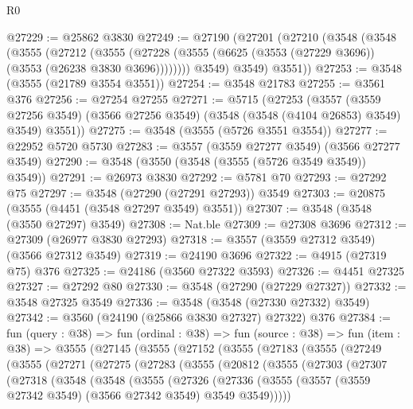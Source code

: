 \begin{lexlean}{R0}
\begin{coremodule}
@27229 := @25862 @3830
@27249 := @27190
    (@27201
      (@27210
        (@3548
          (@3548
            (@3555
              (@27212
                (@3555
                  (@27228 (@3555 (@6625 (@3553 (@27229 @3696)) (@3553 (@26238 @3830 @3696))))))))
            @3549)
          @3549)
        @3551))
@27253 := @3548 (@3555 (@21789 @3554 @3551))
@27254 := @3548 @21783
@27255 := @3561 @376
@27256 := @27254 @27255
@27271 := @5715
    (@27253
      (@3557
        (@3559 @27256 @3549)
        (@3566 @27256 @3549)
        (@3548 (@3548 (@4104 @26853) @3549) @3549)
        @3551))
@27275 := @3548 (@3555 (@5726 @3551 @3554))
@27277 := @22952 @5720 @5730
@27283 := @3557 (@3559 @27277 @3549) (@3566 @27277 @3549)
@27290 := @3548 (@3550 (@3548 (@3555 (@5726 @3549 @3549)) @3549))
@27291 := @26973 @3830
@27292 := @5781 @70
@27293 := @27292 @75
@27297 := @3548 (@27290 (@27291 @27293)) @3549
@27303 := @20875 (@3555 (@4451 (@3548 @27297 @3549) @3551))
@27307 := @3548 (@3548 (@3550 @27297) @3549)
@27308 := Nat.ble
@27309 := @27308 @3696
@27312 := @27309 (@26977 @3830 @27293)
@27318 := @3557 (@3559 @27312 @3549) (@3566 @27312 @3549)
@27319 := @24190 @3696
@27322 := @4915 (@27319 @75) @376
@27325 := @24186 (@3560 @27322 @3593)
@27326 := @4451 @27325
@27327 := @27292 @80
@27330 := @3548 (@27290 (@27229 @27327))
@27332 := @3548 @27325 @3549
@27336 := @3548 (@3548 (@27330 @27332) @3549)
@27342 := @3560 (@24190 (@25866 @3830 @27327) @27322) @376
@27384 := fun (query : @38) =>
  fun (ordinal : @38) =>
  fun (source : @38) =>
  fun (item : @38) =>
  @3555
    (@27145
      (@3555
        (@27152
          (@3555
            (@27183
              (@3555
                (@27249
                  (@3555
                    (@27271
                      (@27275
                        (@27283
                          (@3555
                            (@20812
                              (@3555
                                (@27303
                                  (@27307
                                    (@27318
                                      (@3548
                                        (@3548
                                          (@3555
                                            (@27326
                                              (@27336
                                                (@3555
                                                  (@3557
                                                    (@3559 @27342 @3549)
                                                    (@3566 @27342 @3549)
                                                    @3549
                                                    @3549)))))

\end{coremodule}
\end{lexlean}
